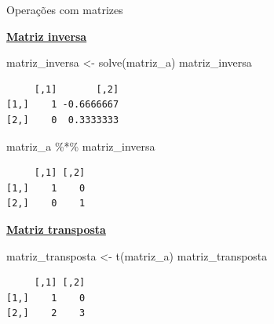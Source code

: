 \documentclass[
  10pt,
  ignorenonframetext,
]{beamer}
\newenvironment{Shaded}{\begin{snugshade}}{\end{snugshade}}
\newcommand{\FunctionTok}[1]{\textcolor[rgb]{0.28,0.35,0.67}{#1}}
\newcommand{\NormalTok}[1]{\textcolor[rgb]{0.00,0.23,0.31}{#1}}
\newcommand{\OtherTok}[1]{\textcolor[rgb]{0.00,0.23,0.31}{#1}}
\newcommand{\SpecialCharTok}[1]{\textcolor[rgb]{0.37,0.37,0.37}{#1}}
\begin{document}
\begin{frame}[fragile]{Operações com matrizes}
\protect\hypertarget{operauxe7uxf5es-com-matrizes-2}{}
\small

\href{https://pt.wikipedia.org/wiki/Matriz_inversa}{\textbf{Matriz
inversa}}

\begin{Shaded}
\begin{Highlighting}[]
\NormalTok{matriz\_inversa }\OtherTok{\textless{}{-}} \FunctionTok{solve}\NormalTok{(matriz\_a)}
\NormalTok{matriz\_inversa}
\end{Highlighting}
\end{Shaded}

\begin{verbatim}
     [,1]       [,2]
[1,]    1 -0.6666667
[2,]    0  0.3333333
\end{verbatim}

\begin{Shaded}
\begin{Highlighting}[]
\NormalTok{matriz\_a }\SpecialCharTok{\%*\%}\NormalTok{ matriz\_inversa}
\end{Highlighting}
\end{Shaded}

\begin{verbatim}
     [,1] [,2]
[1,]    1    0
[2,]    0    1
\end{verbatim}

\href{https://pt.wikipedia.org/wiki/Matriz_transposta}{\textbf{Matriz
transposta}}

\begin{Shaded}
\begin{Highlighting}[]
\NormalTok{matriz\_transposta }\OtherTok{\textless{}{-}} \FunctionTok{t}\NormalTok{(matriz\_a)}
\NormalTok{matriz\_transposta}
\end{Highlighting}
\end{Shaded}

\begin{verbatim}
     [,1] [,2]
[1,]    1    0
[2,]    2    3
\end{verbatim}

\normalsize
\end{frame}
\end{document}
